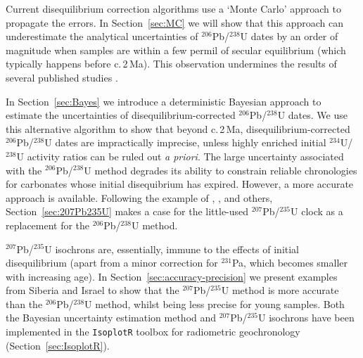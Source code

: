 \documentclass{article}
\begin{document}
Current disequilibrium correction algorithms use a `Monte Carlo'
approach to propagate the errors. In Section~\ref{sec:MC} we will show
that this approach can underestimate the analytical uncertainties of
${}^{206}$Pb/${}^{238}$U dates by an order of magnitude when samples
are within a few permil of secular equilibrium (which typically
happens before c.\,2\,Ma). This observation undermines the results of
several published studies \citep{vermeesch2025}.\medskip

In Section~\ref{sec:Bayes} we introduce a deterministic Bayesian
approach to estimate the uncertainties of disequilibrium-corrected
${}^{206}$Pb/${}^{238}$U dates. We use this alternative algorithm to
show that beyond c.\,2\,Ma, disequilibrium-corrected
${}^{206}$Pb/${}^{238}$U dates are impractically imprecise, unless
highly enriched initial ${}^{234}$U/${}^{238}$U activity ratios can be
ruled out \emph{a priori}. The large uncertainty associated with the
${}^{206}$Pb/${}^{238}$U method degrades its ability to constrain
reliable chronologies for carbonates whose initial disequibrium has
expired. However, a more accurate approach is available. Following the
example of \citet{richards1998}, \citet{neymark2008}, \citet{vaks2020}
and others, Section~\ref{sec:207Pb235U} makes a case for the
little-used ${}^{207}$Pb/${}^{235}$U clock as a replacement for the
${}^{206}$Pb/${}^{238}$U method.\medskip

${}^{207}$Pb/${}^{235}$U isochrons are, essentially, immune to the
effects of initial disequilibrium (apart from a minor correction for
${}^{231}$Pa, which becomes smaller with increasing age).  In
Section~\ref{sec:accuracy-precision} we present examples from Siberia
and Israel to show that the ${}^{207}$Pb/${}^{235}$U method is more
accurate than the ${}^{206}$Pb/${}^{238}$U method, whilst being less
precise for young samples. Both the Bayesian uncertainty estimation
method and ${}^{207}$Pb/${}^{235}$U isochrons have been implemented in
the \texttt{IsoplotR} toolbox for radiometric geochronology
(Section~\ref{sec:IsoplotR}).\medskip
\end{document}
